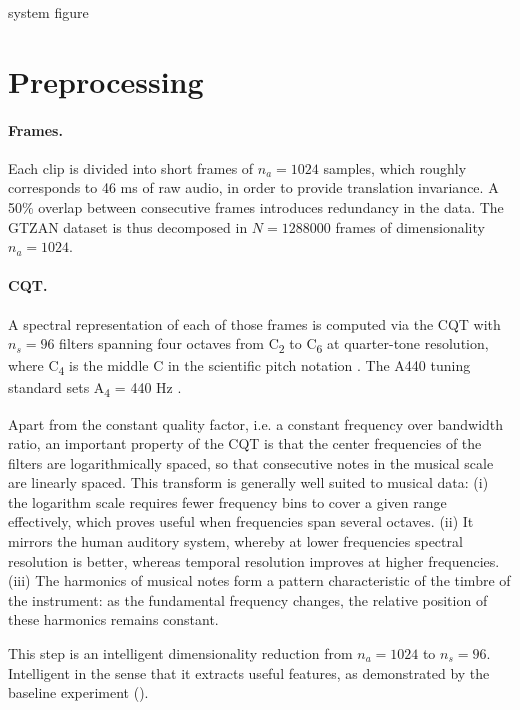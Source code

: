 {\color{red} system figure}

\section{Preprocessing} \label{sec:preprocessing}

\paragraph{Frames.}
Each clip is divided into short frames of $n_a = 1024$ samples, which roughly corresponds to 46 ms of raw audio, in order to provide translation invariance. A 50\% overlap between consecutive frames introduces redundancy in the data. The GTZAN dataset is thus decomposed in $N=1288000$ frames of dimensionality $n_a = 1024$.

\paragraph{\gls{CQT}.}
A spectral representation of each of those frames is computed via the \gls{CQT} with $n_s=96$ filters spanning four octaves from C\textsubscript{2} to C\textsubscript{6} at quarter-tone resolution, where C\textsubscript{4} is the middle C in the scientific pitch notation \cite{young1939ScientificPitch}. The A440 tuning standard sets A\textsubscript{4} = 440 Hz \cite{A440std}.

Apart from the constant quality factor, i.e. a constant frequency over bandwidth ratio, an important property of the \gls{CQT} is that the center frequencies of the filters are logarithmically spaced, so that consecutive notes in the musical scale are linearly spaced.
This transform is generally well suited to musical data: (i) the logarithm scale requires fewer frequency bins to cover a given range effectively, which proves useful when frequencies span several octaves. (ii) It mirrors the human auditory system, whereby at lower frequencies spectral resolution is better, whereas temporal resolution improves at higher frequencies. (iii) The harmonics of musical notes form a pattern characteristic of the timbre of the instrument: as the fundamental frequency changes, the relative position of these harmonics remains constant.

This step is an intelligent dimensionality reduction from $n_a = 1024$ to $n_s = 96$. Intelligent in the sense that it extracts useful features, as demonstrated by the baseline experiment ().

